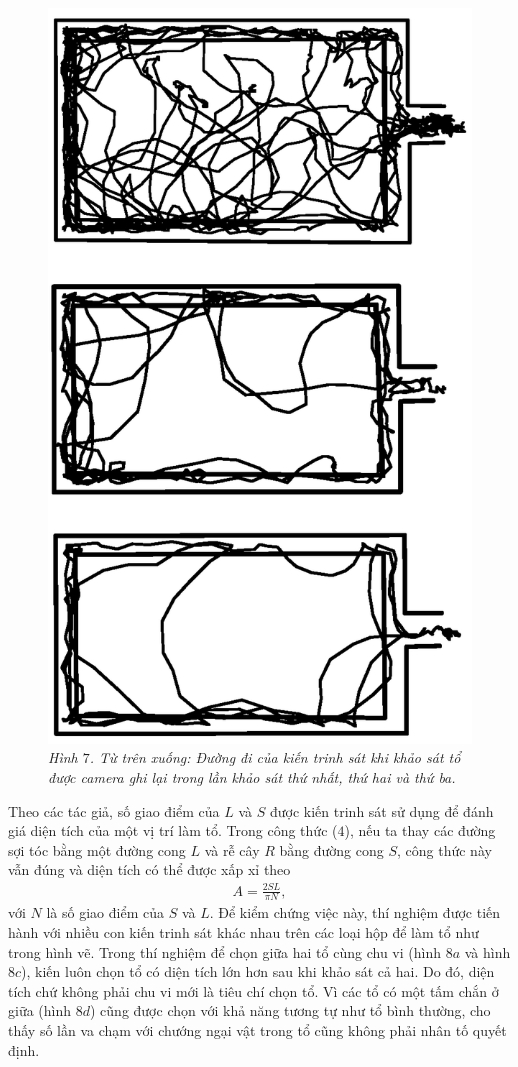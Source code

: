 \begin{multicols}{2}
	\begin{figure}[H]
		\vspace*{-5pt}
		\centering
		\captionsetup{labelformat= empty, justification=centering}
		\includegraphics[width=0.65\linewidth]{10}
		\caption{\small\textit{\color{toanhocdoisong}Hình $7$. Từ trên xuống: Đường đi của kiến trinh sát khi khảo sát tổ được camera ghi lại trong lần khảo sát thứ nhất, thứ hai và thứ ba.}}
		\vspace*{-10pt}
	\end{figure}
	Theo các tác giả, số giao điểm của $L$ và $S$ được kiến trinh sát sử dụng để đánh giá diện tích của một vị trí làm tổ. Trong công thức ($4$), nếu ta thay các đường sợi tóc bằng một đường cong $L$ và rễ cây $R$ bằng đường cong $S$, công thức này vẫn đúng và diện tích có thể được xấp xỉ theo 
	\begin{align*}
		A = \frac{2SL}{\pi N}, \tag{$5$}
	\end{align*}
	với $N$ là số giao điểm của $S$ và $L$.
	\vskip 0.1cm
	Để kiểm chứng việc này, thí nghiệm được tiến hành với nhiều con kiến trinh sát khác nhau trên các loại hộp để làm tổ như trong hình vẽ.
	\vskip 0.1cm
	Trong thí nghiệm để chọn giữa hai tổ cùng chu vi (hình $8a$ và hình $8c$), kiến luôn chọn tổ có diện tích lớn hơn sau khi khảo sát cả hai. Do đó, diện tích chứ không phải chu vi mới là tiêu chí chọn tổ. Vì các tổ có một tấm chắn ở giữa (hình $8d$) cũng được chọn với khả năng tương tự như tổ bình thường, cho thấy số lần va chạm với chướng ngại vật trong tổ cũng không phải nhân tố quyết định.

\end{multicols}
